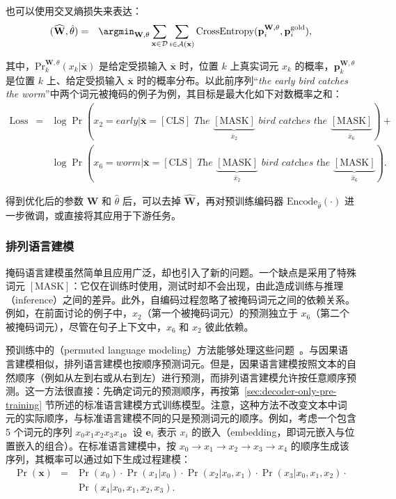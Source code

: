 \noindent 也可以使用交叉熵损失来表达：
\begin{eqnarray}
(\widehat{\mathbf{W}},\hat{\theta}) & = & \argmin_{\mathbf{W},\theta} \sum_{\mathbf{x} \in \mathcal{D}} \sum_{i \in \mathcal{A}(\mathbf{x})} \mathrm{CrossEntropy}(\mathbf{p}_{i}^{\mathbf{W},\theta},\mathbf{p}_{i}^{\mathrm{gold}}),
\end{eqnarray}

\noindent 其中，$\mathrm{Pr}_k^{\mathbf{W},\theta}(x_k|\bar{\mathbf{x}})$ 是给定受损输入 $\bar{\mathbf{x}}$ 时，位置 $k$ 上真实词元 $x_k$ 的概率，$\mathbf{p}_{k}^{\mathbf{W},\theta}$ 是位置 $k$ 上、给定受损输入 $\bar{\mathbf{x}}$ 时的概率分布。以此前序列“\textit{the early bird catches the worm}”中两个词元被掩码的例子为例，其目标是最大化如下对数概率之和：
\begin{eqnarray}
\mathrm{Loss} & = & \log \Pr(x_2 = \textit{early}|\bar{\mathbf{x}}=\textit{$[\mathrm{CLS}]$ The $\underbrace{[\mathrm{MASK}]}_{\bar{x}_2}$ bird catches the $\underbrace{[\mathrm{MASK}]}_{\bar{x}_6}$}) + \nonumber \\
  &   & \log \Pr(x_6 = \textit{worm}|\bar{\mathbf{x}}=\textit{$[\mathrm{CLS}]$ The $\underbrace{[\mathrm{MASK}]}_{\bar{x}_2}$ bird catches the $\underbrace{[\mathrm{MASK}]}_{\bar{x}_6}$}).
\end{eqnarray}

得到优化后的参数 $\widehat{\mathbf{W}}$ 和 $\hat{\theta}$ 后，可以去掉 $\widehat{\mathbf{W}}$，再对预训练编码器 $\mathrm{Encode}_{\hat{\theta}}(\cdot)$ 进一步微调，或直接将其应用于下游任务。

\subsubsection{排列语言建模}

\noindent 掩码语言建模虽然简单且应用广泛，却也引入了新的问题。一个缺点是采用了特殊词元 $[\mathrm{MASK}]$：它仅在训练时使用，测试时却不会出现，由此造成训练与推理（inference）之间的差异。此外，自编码过程忽略了被掩码词元之间的依赖关系。例如，在前面讨论的例子中，$x_2$（第一个被掩码词元）的预测独立于 $x_6$（第二个被掩码词元），尽管在句子上下文中，$x_6$ 和 $x_2$ 彼此依赖。

预训练中的（permuted language modeling）方法能够处理这些问题~\cite{yang-etal:2019xlnet}。与因果语言建模相似，排列语言建模也按顺序预测词元。但是，因果语言建模按照文本的自然顺序（例如从左到右或从右到左）进行预测，而排列语言建模允许按任意顺序预测。这一方法很直接：先确定词元的预测顺序，再按第~\ref{sec:decoder-only-pre-training} 节所述的标准语言建模方式训练模型。注意，这种方法不改变文本中词元的实际顺序，与标准语言建模不同的只是预测词元的顺序。例如，考虑一个包含 5 个词元的序列 $x_0 x_1 x_2 x_3 x_4$。设 $\mathbf{e}_i$ 表示 $x_i$ 的嵌入（embedding，即词元嵌入与位置嵌入的组合）。在标准语言建模中，按 $x_0 \to x_1 \to x_2 \to x_3 \to x_4$ 的顺序生成该序列，其概率可以通过如下生成过程建模：
\begin{eqnarray}
\Pr(\mathbf{x}) & = & \Pr(x_0) \cdot \Pr(x_1|x_0) \cdot \Pr(x_2|x_0,x_1) \cdot \Pr(x_3|x_0,x_1,x_2) \cdot \nonumber \\
                &   & \Pr(x_4|x_0,x_1,x_2,x_3).
\end{eqnarray}

